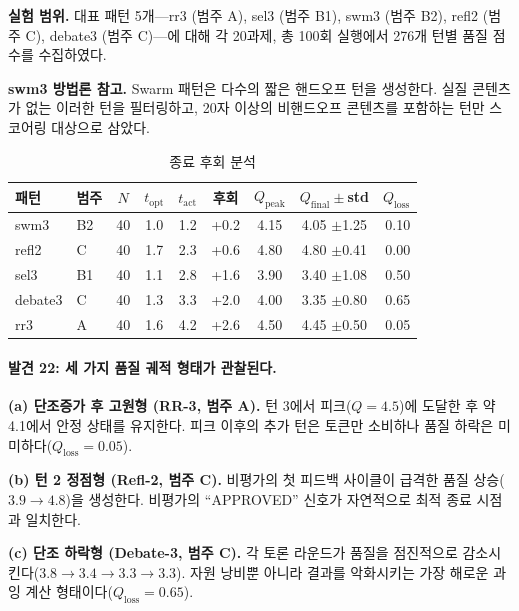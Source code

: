 \documentclass[a4paper,11pt]{article}
\begin{document}
\textbf{실험 범위.} 대표 패턴 5개---rr3 (범주 A), sel3 (범주 B1), swm3 (범주 B2), refl2 (범주 C), debate3 (범주 C)---에 대해 각 20과제, 총 100회 실행에서 276개 턴별 품질 점수를 수집하였다.

\textbf{swm3 방법론 참고.} Swarm 패턴은 다수의 짧은 핸드오프 턴을 생성한다. 실질 콘텐츠가 없는 이러한 턴을 필터링하고, 20자 이상의 비핸드오프 콘텐츠를 포함하는 턴만 스코어링 대상으로 삼았다.

\begin{table}[H]
\centering
\caption{종료 후회 분석}
\label{tab:termination-regret}
{\small
\begin{tabular}{llccccccr}
\toprule
패턴 & 범주 & $N$ & $t_{\text{opt}}$ & $t_{\text{act}}$ & 후회 & $Q_{\text{peak}}$ & $Q_{\text{final}} \pm$std & $Q_{\text{loss}}$ \\
\midrule
swm3    & B2 & 40 & 1.0 & 1.2 & +0.2 & 4.15 & 4.05 $\pm$1.25 & 0.10 \\
refl2   & C  & 40 & 1.7 & 2.3 & +0.6 & 4.80 & 4.80 $\pm$0.41 & 0.00 \\
sel3    & B1 & 40 & 1.1 & 2.8 & +1.6 & 3.90 & 3.40 $\pm$1.08 & 0.50 \\
debate3 & C  & 40 & 1.3 & 3.3 & +2.0 & 4.00 & 3.35 $\pm$0.80 & 0.65 \\
rr3     & A  & 40 & 1.6 & 4.2 & +2.6 & 4.50 & 4.45 $\pm$0.50 & 0.05 \\
\bottomrule
\end{tabular}
}
\end{table}



\paragraph{발견 22: 세 가지 품질 궤적 형태가 관찰된다.}

\textbf{(a) 단조증가 후 고원형 (RR-3, 범주 A).} 턴 3에서 피크($Q=4.5$)에 도달한 후 약 4.1에서 안정 상태를 유지한다. 피크 이후의 추가 턴은 토큰만 소비하나 품질 하락은 미미하다($Q_{\text{loss}}=0.05$).

\textbf{(b) 턴 2 정점형 (Refl-2, 범주 C).} 비평가의 첫 피드백 사이클이 급격한 품질 상승($3.9 \to 4.8$)을 생성한다. 비평가의 ``APPROVED'' 신호가 자연적으로 최적 종료 시점과 일치한다.

\textbf{(c) 단조 하락형 (Debate-3, 범주 C).} 각 토론 라운드가 품질을 점진적으로 감소시킨다($3.8 \to 3.4 \to 3.3 \to 3.3$). 자원 낭비뿐 아니라 결과를 악화시키는 가장 해로운 과잉 계산 형태이다($Q_{\text{loss}}=0.65$).
\end{document}
